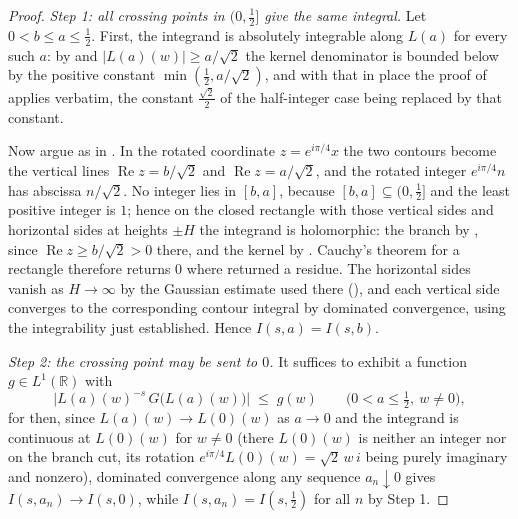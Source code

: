 \begin{proof}
\leanok
{}
\emph{Step 1: all crossing points in $(0,\tfrac12]$ give the same integral.}  Let
$0<b\le a\le\tfrac12$.  First, the integrand is absolutely integrable along $L(a)$ for every such
$a$: by  and $\lvert L(a)(w)\rvert\ge a/\sqrt2$ the
kernel denominator is bounded below by the positive constant $\min(\tfrac12,a/\sqrt2)$, and with that
in place the proof of  applies verbatim, the constant $\tfrac{\sqrt2}2$ of
the half-integer case being replaced by that constant.

Now argue as in .  In the rotated coordinate $z=e^{i\pi/4}x$ the two contours
become the vertical lines $\operatorname{Re}z=b/\sqrt2$ and $\operatorname{Re}z=a/\sqrt2$, and the
rotated integer $e^{i\pi/4}n$ has abscissa $n/\sqrt2$.  No integer lies in $[b,a]$, because
$[b,a]\subseteq(0,\tfrac12]$ and the least positive integer is $1$; hence on the closed rectangle
with those vertical sides and horizontal sides at heights $\pm H$ the integrand is holomorphic:
the branch by , since $\operatorname{Re}z\ge b/\sqrt2>0$ there, and the kernel
by .  Cauchy's theorem for a rectangle therefore returns $0$ where
 returned a residue.  The horizontal sides vanish as $H\to\infty$ by the Gaussian
estimate used there (), and each vertical side converges to the
corresponding contour integral by dominated convergence, using the integrability just established.
Hence $I(s,a)=I(s,b)$.

\emph{Step 2: the crossing point may be sent to $0$.}  It suffices to exhibit a function
$g\in L^{1}(\mathbb{R})$ with
\[
  \bigl\lvert L(a)(w)^{-s}\,G\bigl(L(a)(w)\bigr)\bigr\rvert\;\le\;g(w)
  \qquad\bigl(0<a\le\tfrac12,\ w\ne0\bigr),
\]
for then, since $L(a)(w)\to L(0)(w)$ as $a\to0$ and the integrand is continuous at $L(0)(w)$ for
$w\ne0$ (there $L(0)(w)$ is neither an integer nor on the branch cut, its rotation
$e^{i\pi/4}L(0)(w)=\sqrt2\,w\,i$ being purely imaginary and nonzero), dominated convergence along
any sequence $a_{n}\downarrow0$ gives $I(s,a_{n})\to I(s,0)$, while $I(s,a_{n})=I(s,\tfrac12)$ for
all $n$ by Step 1.


\end{proof}
